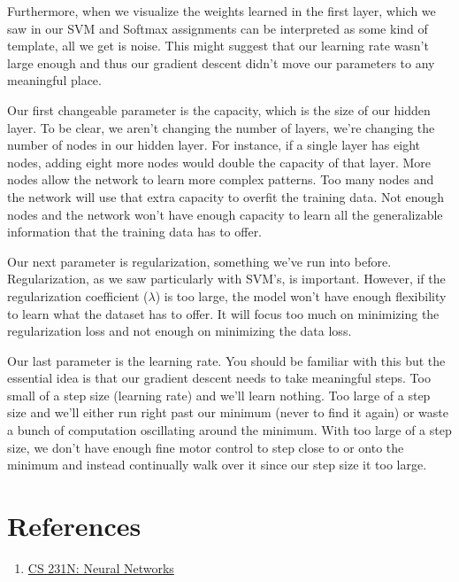 \documentclass[12pt]{article}
\begin{document}
Furthermore, when we visualize the weights learned in the first layer, which we saw in our SVM and Softmax
assignments can be interpreted as some kind of template, all we get is noise. This might suggest that our 
learning rate wasn't large enough and thus our gradient descent didn't move our parameters to any meaningful 
place.  

Our first changeable parameter is the capacity, which is the size of our hidden layer. To be clear, we aren't 
changing the number of layers, we're changing the number of nodes in our hidden layer. For instance, if a single
layer has eight nodes, adding eight more nodes would double the capacity of that layer. More nodes allow
the network to learn more complex patterns. Too many nodes and the network will use that extra capacity to 
overfit the training data. Not enough nodes and the network won't have enough capacity to learn all the 
generalizable information that the training data has to offer. 

Our next parameter is regularization, something we've run into before. Regularization, as we saw particularly
with SVM's, is important. However, if the regularization coefficient ($\lambda$) is too large, the model 
won't have enough flexibility to learn what the dataset has to offer. It will focus too much on minimizing 
the regularization loss and not enough on minimizing the data loss. 

Our last parameter is the learning rate. You should be familiar with this but the essential idea is that 
our gradient descent needs to take meaningful steps. Too small of a step size (learning rate) and we'll 
learn nothing. Too large of a step size and we'll either run right past our minimum (never to find it 
again) or waste a bunch of computation oscillating around the minimum. With too large of a step size, 
we don't have enough fine motor control to step close to or onto the minimum and instead continually walk 
over it since our step size it too large. 



\section{References}
\begin{enumerate}
    \item \href{https://cs231n.github.io/neural-networks-1/}{CS 231N: Neural Networks}
\end{enumerate}
\end{document}
